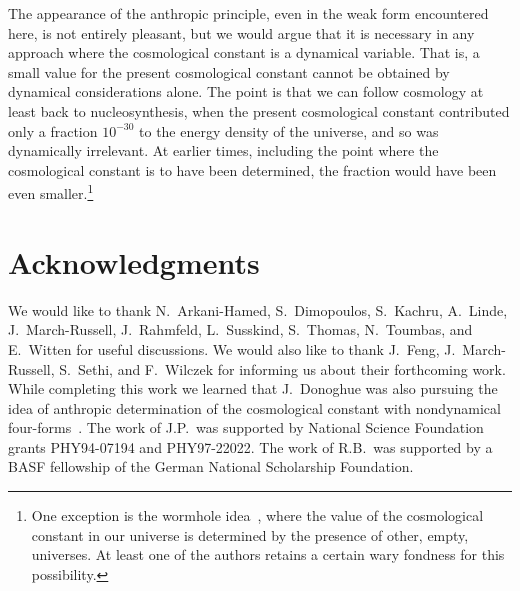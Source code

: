 \documentclass[12pt]{article}
\begin{document}
The appearance of the anthropic principle, even in the weak form
encountered here, is not entirely pleasant, but we would argue that it
is necessary in any approach where the cosmological constant is a
dynamical variable.  That is, a small value for the present
cosmological constant cannot be obtained by dynamical considerations
alone.  The point is that we can follow cosmology at least back to
nucleosynthesis, when the present cosmological constant contributed
only a fraction $10^{-30}$ to the energy density of the universe, and
so was dynamically irrelevant.  At earlier times, including the point
where the cosmological constant is to have been determined, the
fraction would have been even smaller.\footnote{One exception is the
wormhole idea~\cite{Col88a}, where the value of the cosmological
constant in our universe is determined by the presence of other,
empty, universes.  At least one of the authors retains a certain wary
fondness for this possibility.}


\section*{Acknowledgments}

We would like to thank N.~Arkani-Hamed, S.~Dimopoulos, S.~Kachru,
A.~Lin\-de, J.~March-Russell, J.~Rahmfeld, L.~Susskind, S.~Thomas,
N.~Toumbas, and E.~Witten for useful discussions.  We would also like
to thank J.~Feng, J.~March-Russell, S.~Sethi, and F.~Wilczek for
informing us about their forthcoming work.  While completing this work
we learned that J.~Donoghue was also pursuing the idea of anthropic
determination of the cosmological constant with nondynamical
four-forms~\cite{Don00}.  The work of J.P.\ was supported by National
Science Foundation grants PHY94-07194 and PHY97-22022.  The work of
R.B.\ was supported by a BASF fellowship of the German National
Scholarship Foundation.






\end{document}
